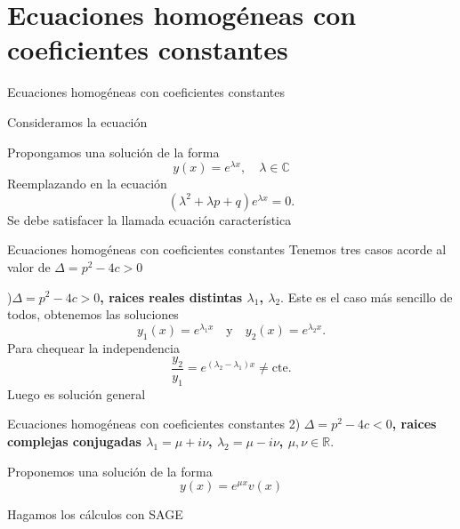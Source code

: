 \documentclass[handout,hyperref={colorlinks=true}]{beamer}
\newcommand{\rr}{\mathbb{R}}
\renewcommand{\emph}[1]{\textcolor[rgb]{1,0,0}{#1}}
\newcommand{\nl}{\onslide<+-> }
\begin{document}
 \section{Ecuaciones homogéneas con coeficientes constantes}
\begin{frame}{Ecuaciones homogéneas con coeficientes constantes}
 
 Consideramos la ecuación
 
 \boxedeq{y''+py'+qy=0,\quad p,q\in\rr}\label{2orden_coef_ctes}
    
 Propongamos una solución de la forma 
 \[\boxed{y(x)=e^{\lambda x},\quad \lambda\in\mathbb{C}}\]
 Reemplazando en la ecuación
 \[(\lambda^2+\lambda p+q)e^{\lambda x}=0.\]
Se debe satisfacer la llamada \emph{ecuación característica}
\end{frame}

\begin{frame}{Ecuaciones homogéneas con coeficientes constantes}
Tenemos tres casos acorde al valor de $\Delta=p^2-4c>0$

\nl 1)\textbf{$\boxed{\Delta=p^2-4c>0}$, raices reales distintas $\lambda_1$, $\lambda_2$}. Este es el caso más sencillo de todos, obtenemos las soluciones
\[y_1(x)=e^{\lambda_1 x}\quad\text{y}\quad y_2(x)=e^{\lambda_2 x}.\]
Para chequear la independencia
\[\frac{y_2}{y_1}=e^{(\lambda_2-\lambda_1)x}\neq\text{cte}.\]
Luego 
es solución general
\end{frame}

\begin{frame}{Ecuaciones homogéneas con coeficientes constantes}
2) \textbf{$\boxed{\Delta=p^2-4c<0}$, raices complejas conjugadas $\lambda_1=\mu+i\nu$, $\lambda_2=\mu-i\nu$, $\mu,\nu\in\rr$}.

Proponemos una solución de la forma
\[
 y(x)=e^{\mu x}v(x)
\]

Hagamos los cálculos con SAGE
 



\end{frame}

\end{document}
